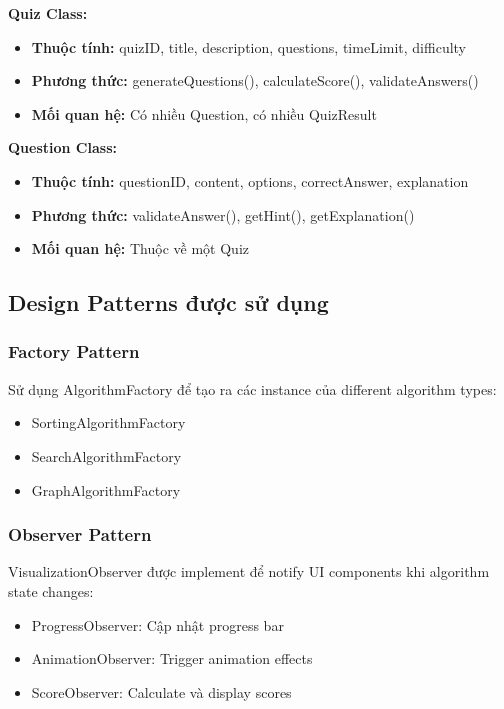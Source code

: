 \textbf{Quiz Class:}
\begin{itemize}
    \item \textbf{Thuộc tính:} quizID, title, description, questions, timeLimit, difficulty
    \item \textbf{Phương thức:} generateQuestions(), calculateScore(), validateAnswers()
    \item \textbf{Mối quan hệ:} Có nhiều Question, có nhiều QuizResult
\end{itemize}

\textbf{Question Class:}
\begin{itemize}
    \item \textbf{Thuộc tính:} questionID, content, options, correctAnswer, explanation
    \item \textbf{Phương thức:} validateAnswer(), getHint(), getExplanation()
    \item \textbf{Mối quan hệ:} Thuộc về một Quiz
\end{itemize}

\subsection{Design Patterns được sử dụng}

\subsubsection{Factory Pattern}
Sử dụng AlgorithmFactory để tạo ra các instance của different algorithm types:
\begin{itemize}
    \item SortingAlgorithmFactory
    \item SearchAlgorithmFactory  
    \item GraphAlgorithmFactory
\end{itemize}

\subsubsection{Observer Pattern}
VisualizationObserver được implement để notify UI components khi algorithm state changes:
\begin{itemize}
    \item ProgressObserver: Cập nhật progress bar
    \item AnimationObserver: Trigger animation effects
    \item ScoreObserver: Calculate và display scores
\end{itemize}

